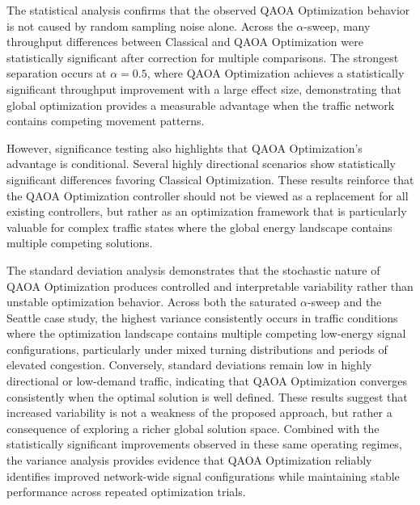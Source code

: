 \documentclass[12pt]{article}
\begin{document}
The statistical analysis confirms that the observed QAOA Optimization behavior is not caused by random sampling noise alone. Across the $\alpha$-sweep, many throughput differences between Classical and QAOA Optimization were statistically significant after correction for multiple comparisons. The strongest separation occurs at $\alpha=0.5$, where QAOA Optimization achieves a statistically significant throughput improvement with a large effect size, demonstrating that global optimization provides a measurable advantage when the traffic network contains competing movement patterns.

However, significance testing also highlights that QAOA Optimization's advantage is conditional. Several highly directional scenarios show statistically significant differences favoring Classical Optimization. These results reinforce that the QAOA Optimization controller should not be viewed as a replacement for all existing controllers, but rather as an optimization framework that is particularly valuable for complex traffic states where the global energy landscape contains multiple competing solutions.

\begin{figure}[htbp]
\label{fig:qaoa-throughput-alpha-sd}
\end{figure}


\begin{figure}[htbp]
\label{fig:qaoa-travel-wait-alpha-sd}
\end{figure}


\begin{figure}[htbp]
\label{fig:qaoa-seattle-sd}
\end{figure}

The standard deviation analysis demonstrates that the stochastic nature of QAOA Optimization produces controlled and interpretable variability rather than unstable optimization behavior. Across both the saturated $\alpha$-sweep and the Seattle case study, the highest variance consistently occurs in traffic conditions where the optimization landscape contains multiple competing low-energy signal configurations, particularly under mixed turning distributions and periods of elevated congestion. Conversely, standard deviations remain low in highly directional or low-demand traffic, indicating that QAOA Optimization converges consistently when the optimal solution is well defined. These results suggest that increased variability is not a weakness of the proposed approach, but rather a consequence of exploring a richer global solution space. Combined with the statistically significant improvements observed in these same operating regimes, the variance analysis provides evidence that QAOA Optimization reliably identifies improved network-wide signal configurations while maintaining stable performance across repeated optimization trials.
\end{document}

